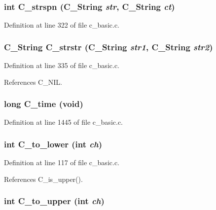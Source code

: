 \subsubsection{\setlength{\rightskip}{0pt plus 5cm}int C\_\-strspn (\bf{C\_\-String} {\em str}, \bf{C\_\-String} {\em ct})}\label{c__basic_8h_c43918876a1062adab478a9e2aa5107b}




Definition at line 322 of file c\_\-basic.c.
\subsubsection{\setlength{\rightskip}{0pt plus 5cm}\bf{C\_\-String} C\_\-strstr (\bf{C\_\-String} {\em str1}, \bf{C\_\-String} {\em str2})}\label{c__basic_8h_5075f80a4e19dfbb232d65d3ac6c15fb}




Definition at line 335 of file c\_\-basic.c.

References C\_\-NIL.
\subsubsection{\setlength{\rightskip}{0pt plus 5cm}long C\_\-time (void)}\label{c__basic_8h_23d871b92e007ec3a9e9937cb26b9b17}




Definition at line 1445 of file c\_\-basic.c.
\subsubsection{\setlength{\rightskip}{0pt plus 5cm}int C\_\-to\_\-lower (int {\em ch})}\label{c__basic_8h_5f5fad17f5660e69be8fe7c41bd2de1b}




Definition at line 117 of file c\_\-basic.c.

References C\_\-is\_\-upper().
\subsubsection{\setlength{\rightskip}{0pt plus 5cm}int C\_\-to\_\-upper (int {\em ch})}\label{c__basic_8h_1b90db0d0093f3fc6828f7609d6e9ff8}




